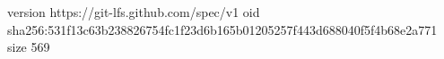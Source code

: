 version https://git-lfs.github.com/spec/v1
oid sha256:531f13c63b238826754fc1f23d6b165b01205257f443d688040f5f4b68e2a771
size 569
